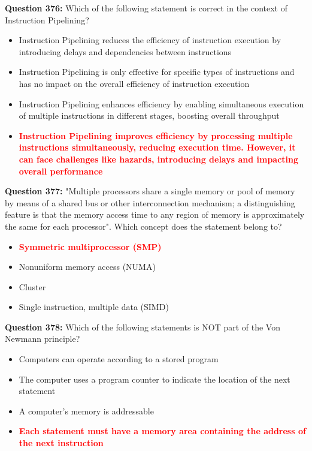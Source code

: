 \documentclass[12pt,a4paper]{article}
\begin{document}
\textbf{Question 376:} Which of the following statement is correct in the context of Instruction Pipelining?

\begin{itemize}
    \item[\textbf{A.}] Instruction Pipelining reduces the efficiency of instruction execution by introducing delays and dependencies between instructions
    \item[\textbf{B.}] Instruction Pipelining is only effective for specific types of instructions and has no impact on the overall efficiency of instruction execution
    \item[\textbf{C.}] Instruction Pipelining enhances efficiency by enabling simultaneous execution of multiple instructions in different stages, boosting overall throughput
    \item[\textbf{D.}] \textcolor{red}{\textbf{Instruction Pipelining improves efficiency by processing multiple instructions simultaneously, reducing execution time. However, it can face challenges like hazards, introducing delays and impacting overall performance}}
\end{itemize}

\vspace{0.5cm}

\textbf{Question 377:} "Multiple processors share a single memory or pool of memory by means of a shared bus or other interconnection mechanism; a distinguishing feature is that the memory access time to any region of memory is approximately the same for each processor". Which concept does the statement belong to?

\begin{itemize}
    \item[\textbf{A.}] \textcolor{red}{\textbf{Symmetric multiprocessor (SMP)}}
    \item[\textbf{B.}] Nonuniform memory access (NUMA)
    \item[\textbf{C.}] Cluster
    \item[\textbf{D.}] Single instruction, multiple data (SIMD)
\end{itemize}

\vspace{0.5cm}

\textbf{Question 378:} Which of the following statements is NOT part of the Von Newmann principle?

\begin{itemize}
    \item[\textbf{A.}] Computers can operate according to a stored program
    \item[\textbf{B.}] The computer uses a program counter to indicate the location of the next statement
    \item[\textbf{C.}] A computer's memory is addressable
    \item[\textbf{D.}] \textcolor{red}{\textbf{Each statement must have a memory area containing the address of the next instruction}}
\end{itemize}
\end{document}
